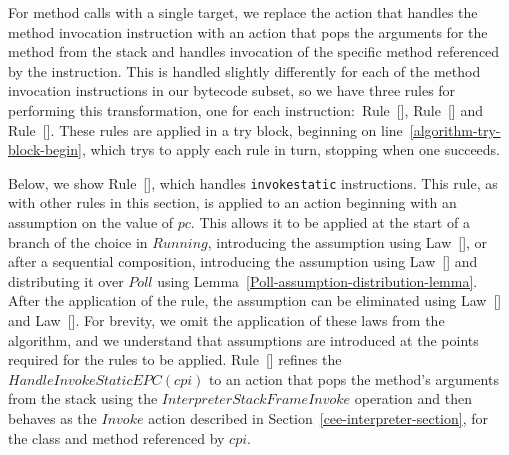For method calls with a single target, we replace the action that
handles the method invocation instruction with an action that pops the
arguments for the method from the stack and handles invocation of the
specific method referenced by the instruction.
This is handled slightly differently for each of the method invocation
instructions in our bytecode subset, so we have three rules for
performing this transformation, one for each
instruction:~Rule~[],
Rule~[] and
Rule~[].
These rules are applied in a try block, beginning on
line~\ref{algorithm-try-block-begin}, which trys to apply each rule in
turn, stopping when one succeeds.

Below, we show Rule~[], which
handles \texttt{invokestatic} instructions.
This rule, as with other rules in this section, is applied to an
action beginning with an assumption on the value of $pc$.
This allows it to be applied at the start of a branch of the choice in
$Running$, introducing the assumption using
Law~[], or after a sequential
composition, introducing the assumption using
Law~[] and distributing it over
$Poll$ using Lemma~\ref{Poll-assumption-distribution-lemma}.
After the application of the rule, the assumption can be eliminated
using Law~[] and
Law~[].
For brevity, we omit the application of these laws from the algorithm,
and we understand that assumptions are introduced at the points
required for the rules to be applied.
Rule~[] refines the
$HandleInvokeStaticEPC(cpi)$ to an action that pops the method's
arguments from the stack using the $InterpreterStackFrameInvoke$
operation and then behaves as the $Invoke$ action described in
Section~\ref{cee-interpreter-section}, for the class and method
referenced by $cpi$.
